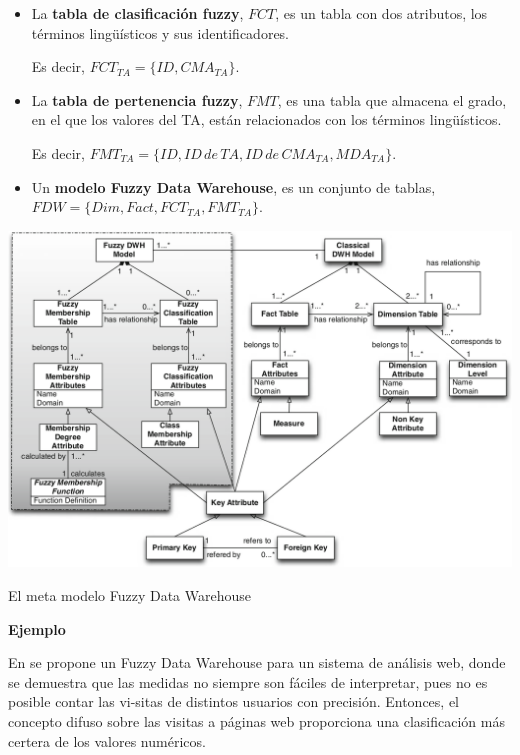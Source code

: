 \documentclass{fancyslides}
\begin{document}
\begin{frame}
\misc
{
\begin{itemize}
  \item \justifying La \textbf{tabla de clasificación fuzzy}, $FCT$, es un tabla con dos atributos, los términos lingüísticos y sus identificadores.
  
  Es decir, $FCT_{TA} = \{ ID, CMA_{TA} \}$.
  \item \justifying La \textbf{tabla de pertenencia fuzzy}, $FMT$, es una tabla que almacena el grado, en el que los valores del TA, están relacionados con los términos lingüísticos.
  
  Es decir, $FMT_{TA} = \{ ID, ID \, de \, TA, ID \, de \, CMA_{TA}, MDA_{TA} \}$.
  
  \item \justifying Un \textbf{modelo Fuzzy Data Warehouse}, es un conjunto de tablas, $FDW = \{Dim, Fact, FCT_{TA}, FMT_{TA} \}$.
\end{itemize}
}
\end{frame}

\begin{frame}
\misc
{

\begin{center}
\includegraphics[scale=0.25]{fuzzy2}

El meta modelo Fuzzy Data Warehouse
\end{center}

}
\end{frame}

\begin{frame}
\misc
{
\textbf{Ejemplo}
\newline

\justifying En \cite{Fasel09} se propone un Fuzzy Data Warehouse para un sistema de análisis web, donde se demuestra que las medidas no siempre son fáciles de interpretar, pues no es posible contar las vi-sitas de distintos usuarios con precisión.
Entonces, el concepto difuso sobre las visitas a páginas web proporciona una clasificación más certera de los valores numéricos.
}
\end{frame}
\end{document}
